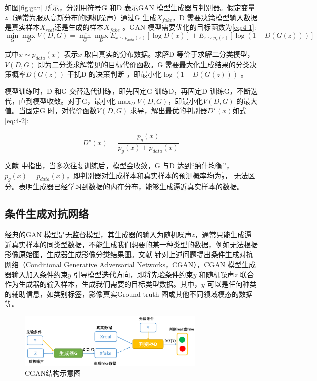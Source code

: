 如图\ref{fig:gan} 所示，分别用符号G 和D 表示GAN 模型生成器与判别器。假定变量$z$（通常为服从高斯分布的随机噪声）通过G 生成$X_{fake}$，D 需要决策模型输入数据是真实样本$X_{real}$还是生成的样本$X_{fake}$ 。GAN 模型需要优化的目标函数为\ref{eq:4-1}:
\begin{equation}
  \label{eq:4-1}
  \mathop{\min}_{G} \mathop{\max}_{D} V(D,G) = \mathop{\min}_{G} \mathop{\max}_{D} E_{x \sim p_{data}(x)} [\log D(x)] + E_{z \sim p_{z}(z)}[ \log (1-D(G(z)))]
\end{equation}

式中$x \sim p_{data}(x)$ 表示$x$ 取自真实的分布数据。求解D 等价于求解二分类模型，$ V(D,G)$ 即为二分类求解常见的目标代价函数。G 需要最大化生成结果的分类决策概率$D(G(z))$ 干扰D 的决策判断 ，即最小化$\log (1-D(G(z)))$ 。

模型训练时，D 和G 交替迭代训练，即先固定G 训练D，再固定D 训练G，不断迭代，直到模型收敛。对于G，最小化$\mathop{\max}_{D} V(D,G) $，即最小化$V(D,G)$ 的最大值。当固定G 时，对代价函数$V(D,G)$ 求导，解出最优的判别器$D^{\star}(x)$如式\ref{eq:4-2}:

\begin{equation}
  \label{eq:4-2}
  D^{\star}(x) = \frac{p_g(x)}{p_g(x)+p_{data}(x)}
\end{equation}

文献\cite{goodfellow2014generative} 中指出，当多次往复训练后，模型会收敛，G 与D 达到“纳什均衡”，$p_g(x) = p_{data}(x)$，即判别器对生成样本和真实样本的预测概率均为$\frac{1}{2}$， 无法区分。表明生成器已经学习到数据的内在分布，能够生成逼近真实样本的数据。


\subsection{条件生成对抗网络}
\label{sec:first-2}
经典的GAN 模型是无监督模型，其生成器的输入为随机噪声$z$，通常只能生成逼近真实样本的同类型数据，不能生成我们想要的某一种类型的数据，例如无法根据影像原始图，生成器生成影像分类结果图。文献\cite{mirza2014conditional} 针对上述问题提出条件生成对抗网络（Conditional Generative Adversarial Networks，CGAN），CGAN 模型生成器输入加入条件约束$y$ 引导模型迭代方向，即将先验条件约束$y$ 和随机噪声$z$ 联合作为生成器的输入样本，生成我们需要的目标类型数据。其中，$y$ 可以是任何种类的辅助信息，如类别标签，影像真实Ground truth 图或其他不同领域模态的数据等。

\begin{figure}[htb]
  \centering
  \includegraphics[width=0.8\textwidth]{figures/cgan}
  \caption{CGAN结构示意图}\label{fig:cgan}
\end{figure}

